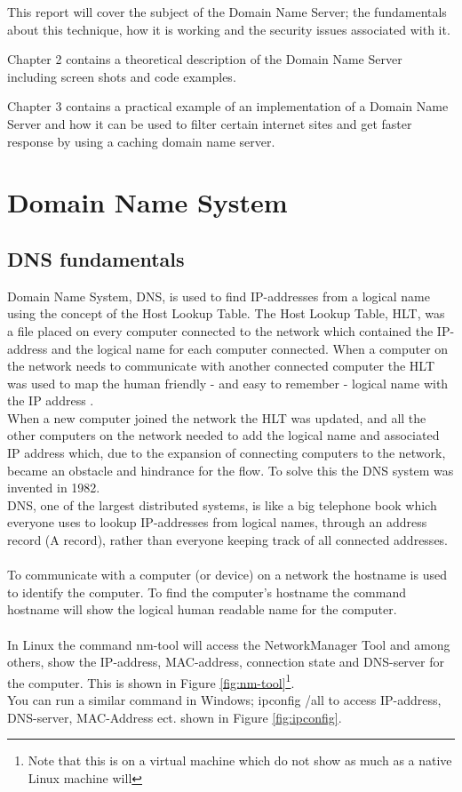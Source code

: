 \documentclass[a4paper,10pt]{report}
\newcommand{\code}[1]{{\fontfamily{pcr}\selectfont #1}}
\begin{document}
This report will cover the subject of the Domain Name Server; the fundamentals about this technique, how it is working and the security issues associated with it.\vspace{10pt}

Chapter 2 contains a theoretical description of the Domain Name Server including screen shots and code examples.\vspace{10pt}

Chapter 3 contains a practical example of an implementation of a Domain Name Server and how it can be used to filter certain internet sites and get faster response by using a caching domain name server.

\chapter{Domain Name System}

\section{DNS fundamentals}
Domain Name System, DNS, is used to find IP-addresses from a logical name using the concept of the Host Lookup Table.
The Host Lookup Table, HLT, was a file placed on every computer connected to the network which contained the IP-address and the logical name for each computer connected. When a computer on the network needs to communicate with another connected computer the HLT was used to map the human friendly - and easy to remember - logical name with the IP address \cite[History section]{wiki-hosts}.
\\When a new computer joined the network the HLT was updated, and all the other computers on the network needed to add the logical name and associated IP address which, due to the expansion of connecting computers to the network, became an obstacle and hindrance for the flow. To solve this the DNS system was invented in 1982\cite[History section]{wiki-dns}.
\\DNS, one of the largest distributed systems, is like a big telephone book which everyone uses to lookup IP-addresses from logical names, through an address record (A record)\cite[p. 209-210]{Tanenbaum}, rather than everyone keeping track of all connected addresses.
\\
\\
To communicate with a computer (or device) on a network the hostname is used to identify the computer. To find the computer's hostname the command \code{hostname} will show the logical human readable name for the computer. 
\\
\\
In Linux the command \code{nm-tool} will access the NetworkManager Tool and among others, show the IP-address, MAC-address, connection state and DNS-server for the computer.
This is shown in Figure \ref{fig:nm-tool}\footnote{Note that this is on a virtual machine which do not show as much as a native Linux machine will}.
\\
You can run a similar command in Windows; \code{ipconfig /all} to access IP-address, DNS-server, MAC-Address ect. shown in Figure \ref{fig:ipconfig}.
\end{document}
